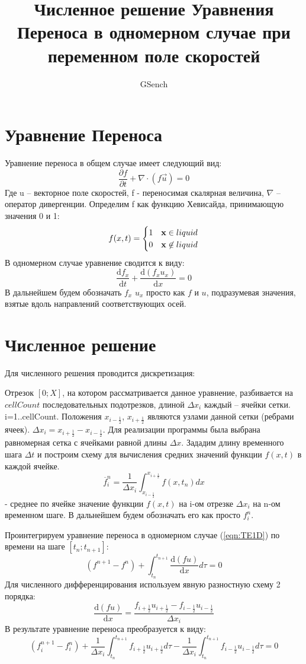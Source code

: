 \documentclass[10pt,a4paper]{article}
\author{GSench}
\title{Численное решение Уравнения Переноса в одномерном случае при переменном поле скоростей}
\begin{document}
\section{Уравнение Переноса}
Уравнение переноса в общем случае имеет следующий вид:
\begin{equation}
\frac{\partial f}{\partial t}+\nabla\cdot(f\overrightarrow{u})=0
\end{equation}
Где u – векторное поле скоростей, f - переносимая скалярная величина, $ \nabla $ – оператор дивергенции. Определим f как функцию Хевисайда, принимающую значения 0 и 1:
\begin{equation}
f(x,t)=\begin{cases}1 & {\bf x}\in liquid \\0 & {\bf x}\not\in liquid\end{cases}
\end{equation}
В одномерном случае уравнение сводится к виду:
\begin{equation}
\label{eqn:TE1D}
\frac{\text{d}f_{x}}{\text{d}t} + \frac{\text{d}(f_{x}u_{x})}{\text{d}x}=0
\end{equation}
В дальнейшем будем обозначать $f_x$ $u_x$ просто как $f$ и $u$, подразумевая значения, взятые вдоль направлений соответствующих осей.

\section{Численное решение}
Для численного решения проводится дискретизация:

Отрезок $[0;X]$, на котором рассматривается данное уравнение, разбивается на $cellCount$ последовательных подотрезков, длиной $\Delta x_i$ каждый – ячейки сетки. i=1..cellCount. Положения $x_{i-\frac{1}{2}}$, $x_{i+\frac{1}{2}}$ являются узлами данной сетки (ребрами ячеек). $\Delta x_i=x_{i+\frac{1}{2}}-x_{i-\frac{1}{2}}$. Для реализации программы была выбрана равномерная сетка с ячейками равной длины $\Delta x$. Зададим длину временного шага $\Delta t$ и построим схему для вычисления средних значений функции $f(x,t)$ в каждой ячейке.
\begin{equation}
\overline{f}_i^n=\frac{1}{\Delta x_i}\int_{x_{i-\frac{1}{2}}}^{x_{i+\frac{1}{2}}}f(x,t_n)dx 
\end{equation}
- среднее по ячейке значение функции $f(x,t)$ на i-ом отрезке $\Delta x_i$ на n-ом временном шаге. В дальнейшем будем обозначать его как просто $f_i^n$.

Проинтегрируем уравнение переноса в одномерном случае (\ref{eqn:TE1D}) по времени на шаге $[t_n; t_{n+1}]$:
\[
(f^{n+1}-f^n)+\int_{t_n}^{t_{n+1}}\frac{\text{d}(f u)}{\text{d}x}d\tau=0
\]
Для численного дифференцирования используем явную разностную схему 2 порядка:
\[
\frac{\text{d}(f u)}{\text{d}x}=\frac{f_{i+\frac{1}{2}}u_{i+\frac{1}{2}}-f_{i-\frac{1}{2}}u_{i-\frac{1}{2}}}{\Delta x_i}
\]
В результате уравнение переноса преобразуется к виду:
\begin{equation}
(f_i^{n+1}-f_i^n)
+
\frac{1}{\Delta x_i}
\int_{t_n}^{t_{n+1}}
f_{i+\frac{1}{2}}u_{i+\frac{1}{2}}d\tau
-
\frac{1}{\Delta x_i}
\int_{t_n}^{t_{n+1}}
f_{i-\frac{1}{2}}u_{i-\frac{1}{2}} d\tau
=0
\end{equation}
\end{document}
